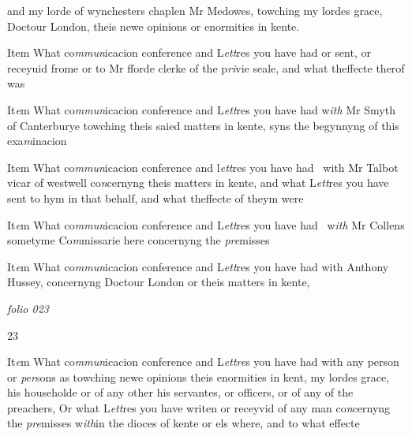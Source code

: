 \documentclass[12pt, a4paper]{book}
\begin{document}
 		and my lorde of wynchesters chaplen Mr Medowes, towching
 		my lordes grace, Doctour London, theis newe opinions or
 enormities in kente.
 	
				\marginpar[\vspace{0.5cm}{\textcolor{Gray}{n}}]{}
			
		\ifthenelse{\isodd{\thepage}}
		{\reversemarginpar}
		{\normalmarginpar}
		Item What co\textit{mmun}icacion conference and L\textit{ett}res you have had or
 sent, or receyuid frome or to Mr fforde clerke of the p\textit{ri}vie
 seale, and what theffecte therof was
 	
		\ifthenelse{\isodd{\thepage}}
		{\reversemarginpar}
		{\normalmarginpar}
		It\textit{e}m What co\textit{mmun}icacion conference and L\textit{ett}res you have had w\textit{ith}
 		Mr Smyth of Canterburye towching theis saied
 matters in kente, syns the begynnyng of this exa\textit{m}inacion
 	
 	
		\ifthenelse{\isodd{\thepage}}
		{\reversemarginpar}
		{\normalmarginpar}
		Item What co\textit{mmun}icacion conference and l\textit{ett}res you have had 
 with Mr Talbot vicar of westwell co\textit{n}cernyng theis
 matters in kente, and what L\textit{ett}res you have sent to hym
 in that behalf, and what theffecte of theym were
 	
 	
		\ifthenelse{\isodd{\thepage}}
		{\reversemarginpar}
		{\normalmarginpar}
		It\textit{e}m What co\textit{mmun}icacion conference and L\textit{ett}res you have had 
 w\textit{ith} Mr Collens sometyme Co\textit{m}missarie here concernyng
 the \textit{pre}misses 
 	
 	
		\ifthenelse{\isodd{\thepage}}
		{\reversemarginpar}
		{\normalmarginpar}
		It\textit{e}m What co\textit{mmun}icacion conference and L\textit{ett}res
 you have had with Anthony Hussey, concernyng
 Doctour London or theis matters in kente,
 

\dotfill
					

\textit{folio 023}


\begin{flushright}{\color{Mahogany}23}\end{flushright}
 	
		\ifthenelse{\isodd{\thepage}}
		{\reversemarginpar}
		{\normalmarginpar}
		It\textit{e}m What co\textit{mmun}icacion conference and L\textit{ettre}s you have
 had with any person or \textit{per}sons as towching newe opinions
 		theis enormities in kent, my lordes grace, his householde
 or of any other his servantes, or officers, or of any
 of the preachers, Or what L\textit{ett}res you have writen
 or receyvid of any man co\textit{n}cernyng the \textit{pre}misses w\textit{ith}in the
 		dioces of kente or els where, and to what effecte
 	
\end{document}
